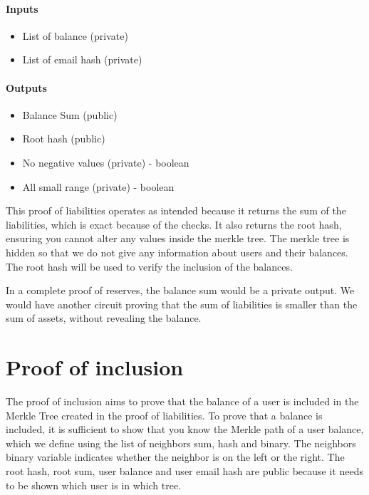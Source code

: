 \paragraph{Inputs}
\begin{itemize}
   \item List of balance (private)
   \item List of email hash (private)
   \end{itemize}

\paragraph{Outputs}
\begin{itemize}
   \item Balance Sum (public)
   \item Root hash (public)
   \item No negative values (private) - boolean
   \item All small range (private) - boolean
   \end{itemize}

This proof of liabilities operates as intended because it returns the sum of the liabilities, which is exact because of the checks.
It also returns the root hash, ensuring you cannot alter any values inside the merkle tree. The merkle tree is hidden so that we do not
give any information about users and their balances.
The root hash will be used to verify the inclusion of the balances.

In a complete proof of reserves, the balance sum would be a private output. We would have another circuit proving that the sum of liabilities is smaller
than the sum of assets, without revealing the balance.

\section{Proof of inclusion}
\label{subsec:pi}
The proof of inclusion aims to prove that the balance of a user is included in the Merkle Tree created in the proof of liabilities.
To prove that a balance is included, it is sufficient to show that you know the Merkle path of a user balance,
which we define using the list of neighbors sum, hash and binary.
The neighbors binary variable indicates whether the neighbor is on the left or the right.
The root hash, root sum, user balance and user email hash are public because it needs to be shown which user is in which tree.


